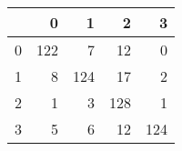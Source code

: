 \begin{tabular}{lrrrr}
\toprule
{} &    0 &    1 &    2 &    3 \\
\midrule
0 &  122 &    7 &   12 &    0 \\
1 &    8 &  124 &   17 &    2 \\
2 &    1 &    3 &  128 &    1 \\
3 &    5 &    6 &   12 &  124 \\
\bottomrule
\end{tabular}
